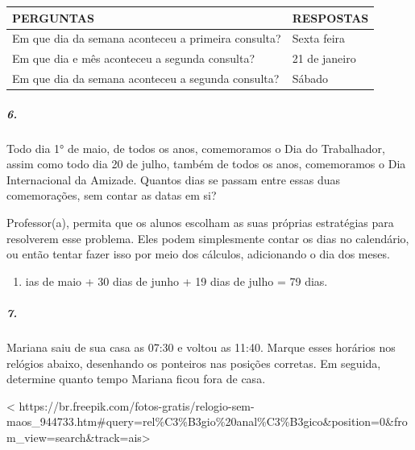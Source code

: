 \begin{longtable}[]{@{}ll@{}}
\toprule
PERGUNTAS & RESPOSTAS\tabularnewline
\midrule
\endhead
Em que dia da semana aconteceu a primeira consulta? & Sexta
feira\tabularnewline
Em que dia e mês aconteceu a segunda consulta? & 21 de
janeiro\tabularnewline
Em que dia da semana aconteceu a segunda consulta? &
Sábado\tabularnewline
\bottomrule
\end{longtable}

\subparagraph{6.}\label{section-47}

Todo dia 1° de maio, de todos os anos, comemoramos o Dia do Trabalhador,
assim como todo dia 20 de julho, também de todos os anos, comemoramos o
Dia Internacional da Amizade. Quantos dias se passam entre essas duas
comemorações, sem contar as datas em si?

Professor(a), permita que os alunos escolham as suas próprias
estratégias para resolverem esse problema. Eles podem simplesmente
contar os dias no calendário, ou então tentar fazer isso por meio dos
cálculos, adicionando o dia dos meses.

\begin{enumerate}
\def\labelenumi{\arabic{enumi}.}
\setcounter{enumi}{29}
\item
  ias de maio + 30 dias de junho + 19 dias de julho = 79 dias.
\end{enumerate}

\subparagraph{7.}\label{section-48}

Mariana saiu de sua casa as 07:30 e voltou as 11:40. Marque esses
horários nos relógios abaixo, desenhando os ponteiros nas posições
corretas. Em seguida, determine quanto tempo Mariana ficou fora de casa.

\textless{}
https://br.freepik.com/fotos-gratis/relogio-sem-maos\_944733.htm\#query=rel\%C3\%B3gio\%20anal\%C3\%B3gico\&position=0\&from\_view=search\&track=ais\textgreater{}

